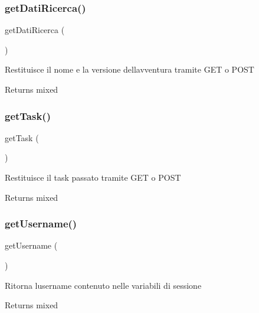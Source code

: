 \subsubsection{\texorpdfstring{get\+Dati\+Ricerca()}{getDatiRicerca()}}
{\footnotesize\ttfamily get\+Dati\+Ricerca (\begin{DoxyParamCaption}{ }\end{DoxyParamCaption})}

Restituisce il nome e la versione dell\textquotesingle{}avventura tramite G\+ET o P\+O\+ST

\begin{DoxyReturn}{Returns}
mixed 
\end{DoxyReturn}
\mbox{\label{class_v_ricerca_a13871c4434338f02d6f8d430fa0597f2}} 
\subsubsection{\texorpdfstring{get\+Task()}{getTask()}}
{\footnotesize\ttfamily get\+Task (\begin{DoxyParamCaption}{ }\end{DoxyParamCaption})}

Restituisce il task passato tramite G\+ET o P\+O\+ST

\begin{DoxyReturn}{Returns}
mixed 
\end{DoxyReturn}
\mbox{\label{class_v_ricerca_a81b37a3c9d639574e394f80c1138c75e}} 
\subsubsection{\texorpdfstring{get\+Username()}{getUsername()}}
{\footnotesize\ttfamily get\+Username (\begin{DoxyParamCaption}{ }\end{DoxyParamCaption})}

Ritorna l\textquotesingle{}username contenuto nelle variabili di sessione

\begin{DoxyReturn}{Returns}
mixed 
\end{DoxyReturn}
\mbox{\label{class_v_ricerca_afcbe39b7f4848575a8fbe4e18c7261b5}} 
